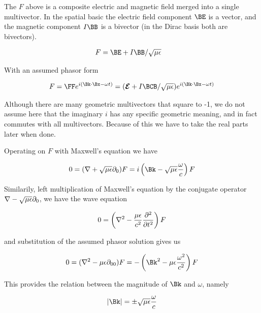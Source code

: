 The $F$ above is a composite electric and magnetic field merged into a single multivector.  In the spatial basic the electric field component $\BE$ is a vector, and the magnetic component $I\BB$ is a bivector (in the Dirac basis both are bivectors).

\begin{align}\label{eqn:foo0}
F &= \BE + I \BB/\sqrt{\mu\epsilon}
\end{align}

With an assumed phasor form

\begin{align}\label{eqn:foo2}
F = \FF e^{ i(\Bk \cdot \Bx - \omega t) } = (\EE + I\BCB/\sqrt{\mu\epsilon}) e^{ i(\Bk \cdot \Bx - \omega t) }
\end{align}

Although there are many geometric multivectors that square to -1, we do not assume here that the imaginary $i$ has any specific geometric meaning, and in fact commutes with all multivectors.  Because of this we have to take the real parts later when done.

Operating on $F$ with Maxwell's equation we have 

\begin{align}\label{eqn:foo3}
0 = (\grad + \sqrt{\mu\epsilon}\partial_0) F = i \left( \Bk - \sqrt{\mu\epsilon}\frac{\omega}{c} \right) F 
\end{align}

Similarily, left multiplication of Maxwell's equation by the conjugate operator $\nabla - \sqrt{\mu\epsilon}\partial_0$, we have the wave equation

\begin{align}\label{eqn:foo4}
0 &= \left(\nabla^2 - \frac{\mu\epsilon}{c^2}\frac{\partial^2}{\partial t^2}\right) F \\
\end{align}

and substitution of the assumed phasor solution gives us

\begin{align}\label{eqn:foo7}
0 = (\grad^2 - {\mu\epsilon}\partial_{00}) F = -\left( \Bk^2 - {\mu\epsilon}\frac{\omega^2}{c^2} \right) F 
\end{align}

This provides the relation between the magnitude of $\Bk$ and $\omega$, namely

\begin{align}\label{eqn:foo8}
\Abs{\Bk} = \pm \sqrt{\mu\epsilon}\frac{\omega}{c} 
\end{align}

